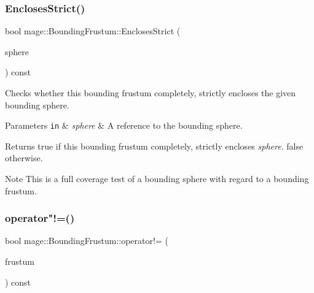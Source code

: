 \subsubsection{\texorpdfstring{Encloses\+Strict()}{EnclosesStrict()}\hspace{0.1cm}{\footnotesize\ttfamily [4/4]}}
{\footnotesize\ttfamily bool mage\+::\+Bounding\+Frustum\+::\+Encloses\+Strict (\begin{DoxyParamCaption}\item[{const \hyperlink{classmage_1_1_bounding_sphere}{Bounding\+Sphere} \&}]{sphere }\end{DoxyParamCaption}) const\hspace{0.3cm}{\ttfamily [noexcept]}}

Checks whether this bounding frustum completely, strictly encloses the given bounding sphere.


\begin{DoxyParams}[1]{Parameters}
\mbox{\tt in}  & {\em sphere} & A reference to the bounding sphere. \\
\hline
\end{DoxyParams}
\begin{DoxyReturn}{Returns}
{\ttfamily true} if this bounding frustum completely, strictly encloses {\itshape sphere}. {\ttfamily false} otherwise. 
\end{DoxyReturn}
\begin{DoxyNote}{Note}
This is a full coverage test of a bounding sphere with regard to a bounding frustum. 
\end{DoxyNote}
\hypertarget{classmage_1_1_bounding_frustum_a20c545cb807db2dc2fad018229f69c2c}{}\label{classmage_1_1_bounding_frustum_a20c545cb807db2dc2fad018229f69c2c} 
\subsubsection{\texorpdfstring{operator"!=()}{operator!=()}}
{\footnotesize\ttfamily bool mage\+::\+Bounding\+Frustum\+::operator!= (\begin{DoxyParamCaption}\item[{const \hyperlink{classmage_1_1_bounding_frustum}{Bounding\+Frustum} \&}]{frustum }\end{DoxyParamCaption}) const\hspace{0.3cm}{\ttfamily [noexcept]}}

